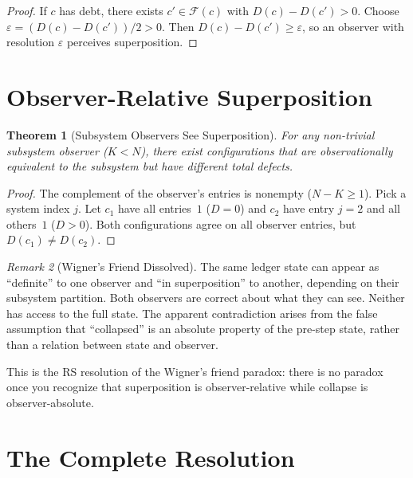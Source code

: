 \documentclass[11pt,a4paper]{article}
\theoremstyle{plain}
\newtheorem{theorem}{Theorem}[section]
\theoremstyle{definition}
\theoremstyle{remark}
\newtheorem{remark}[theorem]{Remark}
\newcommand{\F}{\mathcal{F}}
\begin{document}
\begin{proof}
If $c$ has debt, there exists $c' \in \F(c)$ with $D(c) - D(c') > 0$.
Choose $\varepsilon = (D(c) - D(c'))/2 > 0$.
Then $D(c) - D(c') \ge \varepsilon$, so an observer with resolution $\varepsilon$ perceives superposition.
\end{proof}

\section{Observer-Relative Superposition}\label{sec:relative}

\begin{theorem}[Subsystem Observers See Superposition]\label{thm:subsystem}
For any non-trivial subsystem observer ($K < N$), there exist configurations that are observationally equivalent to the subsystem but have different total defects.
\end{theorem}

\begin{proof}
The complement of the observer's entries is nonempty ($N - K \ge 1$).
Pick a system index $j$.
Let $c_1$ have all entries~$1$ ($D = 0$) and $c_2$ have entry $j = 2$ and all others~$1$ ($D > 0$).
Both configurations agree on all observer entries, but $D(c_1) \ne D(c_2)$.
\end{proof}

\begin{remark}[Wigner's Friend Dissolved]
The same ledger state can appear as ``definite'' to one observer and ``in superposition'' to another, depending on their subsystem partition.
Both observers are correct about what they can see.
Neither has access to the full state.
The apparent contradiction arises from the false assumption that ``collapsed'' is an absolute property of the pre-step state, rather than a relation between state and observer.

This is the RS resolution of the Wigner's friend paradox: there is no paradox once you recognize that superposition is observer-relative while collapse is observer-absolute.
\end{remark}

\section{The Complete Resolution}\label{sec:resolution_section}
\end{document}
